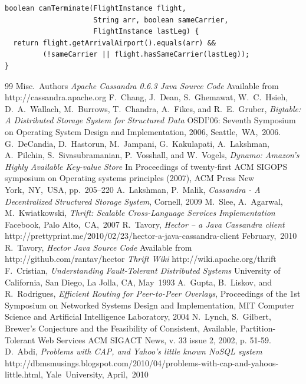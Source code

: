 \documentclass[twocolumn]{article}
\begin{document}
\begin{@twocolumnfalse}
\begin{verbatim}
boolean canTerminate(FlightInstance flight,
                     String arr, boolean sameCarrier,
                     FlightInstance lastLeg) {
  return flight.getArrivalAirport().equals(arr) &&
         (!sameCarrier || flight.hasSameCarrier(lastLeg));
}
\end{verbatim}

\newpage

\end{@twocolumnfalse}

\begin{thebibliography} {99}
 Misc.~Authors {\sl Apache Cassandra 0.6.3 Java Source Code} Available from http://cassandra.apache.org
 F.~Chang, J.~Dean, S.~Ghemawat, W.~C.~Hsieh, D.~A.~Wallach, M.~Burrows, T.~Chandra, A.~Fikes, and R.~E.~Gruber, {\sl Bigtable: A Distributed Storage System for Structured Data} OSDI'06: Seventh Symposium on Operating System Design and Implementation, 2006, Seattle,~WA,~2006.
 G.~DeCandia, D.~Hastorun, M.~Jampani, G.~Kakulapati, A.~Lakshman, A.~Pilchin, S.~Sivasubramanian, P.~Vosshall, and W.~Vogels, {\sl Dynamo: Amazon’s Highly Available Key-value Store} In Proceedings of twenty-first ACM SIGOPS symposium on Operating systems principles (2007), ACM Press New York,~NY,~USA, pp.~205–220
 A.~Lakshman, P.~Malik, {\sl Cassandra - A Decentralized Structured Storage System}, Cornell, 2009
 M.~Slee, A.~Agarwal, M.~Kwiatkowski, {\sl Thrift: Scalable Cross-Language Services Implementation} Facebook, Palo Alto,~CA,~2007
 R.~Tavory, {\sl Hector – a Java Cassandra client} http://prettyprint.me/2010/02/23/hector-a-java-cassandra-client February,~2010
 R.~Tavory, {\sl Hector Java Source Code} Available from http://github.com/rantav/hector
 {\sl Thrift Wiki} http://wiki.apache.org/thrift
 F.~Cristian, {\sl Understanding Fault-Tolerant Distributed Systems} University of California, San Diego, La Jolla, CA, May~1993
 A.~Gupta, B.~Liskov, and R.~Rodrigues, {\sl Efficient Routing for Peer-to-Peer Overlays}, Proceedings of the 1st Symposium on Networked Systems Design and Implementation, MIT Computer Science and Artificial Intelligence Laboratory, 2004
 N.~Lynch, S.~Gilbert, {Brewer's Conjecture and the Feasibility of Consistent, Available, Partition-Tolerant Web Services} ACM SIGACT News, v. 33 issue 2, 2002, p. 51-59.
 D.~Abdi, {\sl Problems with CAP, and Yahoo's little known NoSQL system} http://dbmsmusings.blogspot.com/2010/04/problems-with-cap-and-yahoos-little.html, Yale~University, April,~2010

\end{thebibliography}
\end{document}
